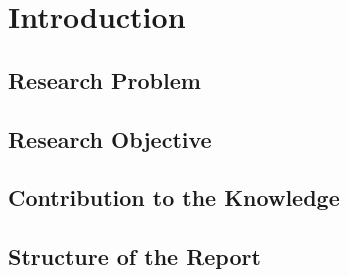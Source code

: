 \chapter{Introduction}
\section{Research Problem}
\section{Research Objective}
\section{Contribution to the Knowledge}
\section{Structure of the Report}
